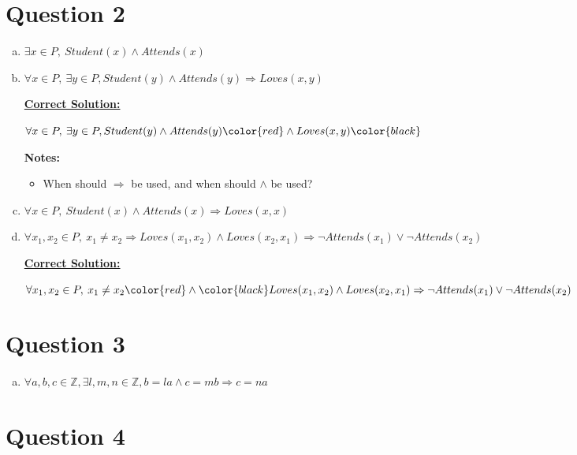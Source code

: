 \documentclass[12pt]{article}
\begin{document}
\section*{Question 2}
\begin{enumerate}[a.]
    \item $\exists x \in P,\:Student(x) \land Attends(x)$
    \item

    $\forall x \in P,\:\exists y \in P, Student(y) \land Attends(y) \Rightarrow Loves(x,y)$

    \begin{mdframed}
        \underline{\textbf{Correct Solution:}}

        \bigskip

        $\forall x \in P,\:\exists y \in P, Student(y) \land Attends(y) \color{red}\land Loves(x,y)\color{black}$
    \end{mdframed}

    \textbf{Notes:}
    \begin{itemize}
        \item When should $\Rightarrow$ be used, and when should $\land$ be used?
    \end{itemize}

    \item

    $\forall x \in P,\: Student(x) \land Attends(x) \Rightarrow Loves(x,x)$

    \item

    $\forall x_1,x_2 \in P,\: x_1 \neq x_2 \Rightarrow Loves(x_1,x_2) \land
    Loves(x_2,x_1) \Rightarrow \neg Attends(x_1) \lor \neg Attends(x_2)$

    \begin{mdframed}
        \underline{\textbf{Correct Solution:}}

        \bigskip

        $\forall x_1,x_2 \in P,\: x_1 \neq x_2 \color{red}\land\color{black} Loves(x_1,x_2) \land
        Loves(x_2,x_1) \Rightarrow \neg Attends(x_1) \lor \neg Attends(x_2)$
    \end{mdframed}
\end{enumerate}

\section*{Question 3}
\begin{enumerate}[a.]
    \item

    $\forall a,b,c \in \mathbb{Z}, \exists l,m,n \in \mathbb{Z}, b = la \land c = mb
    \Rightarrow c = na$

\end{enumerate}

\section*{Question 4}
\end{document}
